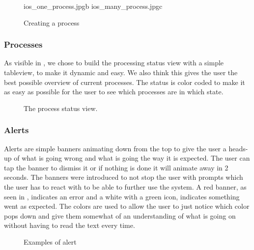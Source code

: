 \begin{figure}[h!]
	{ios_one_process.jpg}{b}
	{ios_many_process.jpg}{c}
\caption{\footnotesize Creating a process}
\label{fig:ios_creating_process}
\end{figure}
\FloatBarrier

\subsubsection{Processes}

As visible in , we chose to build the processing status view with a simple tableview, to make it dynamic and easy. We also think this gives the user the best possible overview of current processes. The status is color coded to make it as easy as possible for the user to see which processes are in which state.
\begin{figure}[h]
\caption{\footnotesize The process status view.}
\label{fig:ios_processingStatus}
\end{figure}
\FloatBarrier

\subsubsection{Alerts}
Alerts are simple banners animating down from the top to give the user a heads-up of what is going wrong and what is going the way it is expected. The user can tap the banner to dismiss it or if nothing is done it will animate away in 2 seconds. The banners were introduced to not stop the user with prompts which the user has to react with to be able to further use the system. A red banner, as seen in , indicates an error and a white with a green icon, indicates something went as expected. The colors are used to allow the user to just notice which color pops down and give them somewhat of an understanding of what is going on without having to read the text every time.
\begin{figure}[ht]
\caption{\footnotesize Examples of alert}
\label{fig:ios_alerts}
\end{figure}
\FloatBarrier


